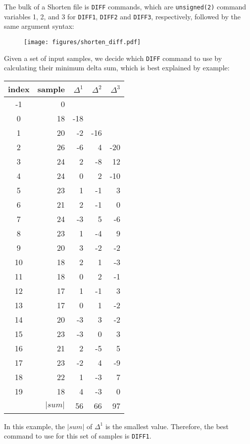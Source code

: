 The bulk of a Shorten file is \texttt{DIFF} commands,
which are \texttt{unsigned(2)} command variables 1, 2, and 3
for \texttt{DIFF1}, \texttt{DIFF2} and \texttt{DIFF3}, respectively,
followed by the same argument syntax:
\begin{figure}[h]
\texttt{[image: figures/shorten\_diff.pdf]}
\end{figure}
\par
Given a set of input samples, we decide which \texttt{DIFF} command
to use by calculating their minimum delta sum, which is best
explained by example:
\par
\begin{table}[h]
{
\begin{tabular}{|c|r|r|r|r|}
\hline
index & sample & $\Delta^1$ & $\Delta^2$ & $\Delta^3$ \\
\hline
-1 & 0 & & & \\
0 & 18 & -18 & & \\
1 & 20 & -2 & -16 & \\
2 & 26 & -6 & 4 & -20 \\
3 & 24 & 2 & -8 & 12 \\
4 & 24 & 0 & 2 & -10 \\
5 & 23 & 1 & -1 & 3 \\
6 & 21 & 2 & -1 & 0 \\
7 & 24 & -3 & 5 & -6 \\
8 & 23 & 1 & -4 & 9 \\
9 & 20 & 3 & -2 & -2 \\
10 & 18 & 2 & 1 & -3 \\
11 & 18 & 0 & 2 & -1 \\
12 & 17 & 1 & -1 & 3 \\
13 & 17 & 0 & 1 & -2 \\
14 & 20 & -3 & 3 & -2 \\
15 & 23 & -3 & 0 & 3 \\
16 & 21 & 2 & -5 & 5 \\
17 & 23 & -2 & 4 & -9 \\
18 & 22 & 1 & -3 & 7 \\
19 & 18 & 4 & -3 & 0 \\
\hline
\multicolumn{2}{|r|}{$| sum |$} & 56 & 66 & 97 \\
\hline
\end{tabular}
}
\end{table}
\par
\noindent
In this example, the $|sum|$ of $\Delta^1$ is the smallest value.
Therefore, the best command to use for this set of samples is \texttt{DIFF1}.
